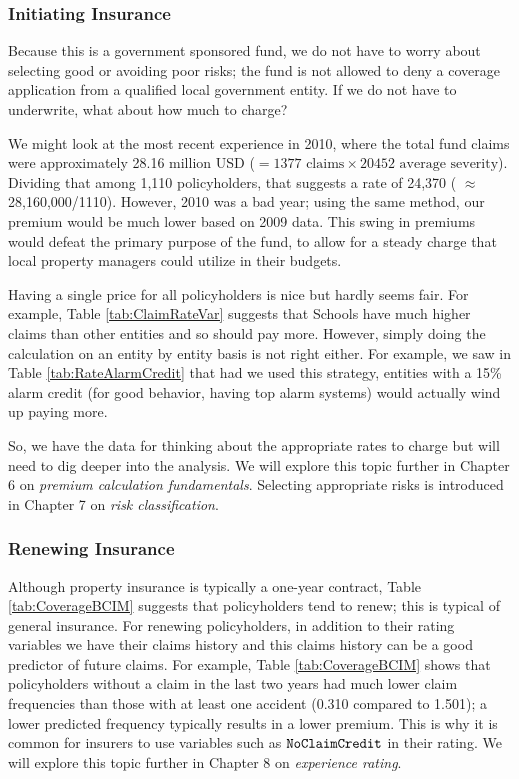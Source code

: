 \documentclass[]{book}
\begin{document}
\subsubsection*{Initiating Insurance}\label{initiating-insurance-1}

Because this is a government sponsored fund, we do not have to worry
about selecting good or avoiding poor risks; the fund is not allowed to
deny a coverage application from a qualified local government entity. If
we do not have to underwrite, what about how much to charge?

We might look at the most recent experience in 2010, where the total
fund claims were approximately 28.16 million USD
(\(=1377 \text{ claims} \times 20452 \text{ average severity}\)).
Dividing that among 1,110 policyholders, that suggests a rate of 24,370
( \(\approx\) 28,160,000/1110). However, 2010 was a bad year; using the
same method, our premium would be much lower based on 2009 data. This
swing in premiums would defeat the primary purpose of the fund, to allow
for a steady charge that local property managers could utilize in their
budgets.

Having a single price for all policyholders is nice but hardly seems
fair. For example, Table \ref{tab:ClaimRateVar} suggests that Schools
have much higher claims than other entities and so should pay more.
However, simply doing the calculation on an entity by entity basis is
not right either. For example, we saw in Table \ref{tab:RateAlarmCredit}
that had we used this strategy, entities with a 15\% alarm credit (for
good behavior, having top alarm systems) would actually wind up paying
more.

So, we have the data for thinking about the appropriate rates to charge
but will need to dig deeper into the analysis. We will explore this
topic further in Chapter 6 on \emph{premium calculation fundamentals}.
Selecting appropriate risks is introduced in Chapter 7 on \emph{risk
classification}.

\subsubsection*{Renewing Insurance}\label{renewing-insurance-1}

Although property insurance is typically a one-year contract, Table
\ref{tab:CoverageBCIM} suggests that policyholders tend to renew; this
is typical of general insurance. For renewing policyholders, in addition
to their rating variables we have their claims history and this claims
history can be a good predictor of future claims. For example, Table
\ref{tab:CoverageBCIM} shows that policyholders without a claim in the
last two years had much lower claim frequencies than those with at least
one accident (0.310 compared to 1.501); a lower predicted frequency
typically results in a lower premium. This is why it is common for
insurers to use variables such as \({\tt NoClaimCredit}\) in their
rating. We will explore this topic further in Chapter 8 on
\emph{experience rating}.
\end{document}
